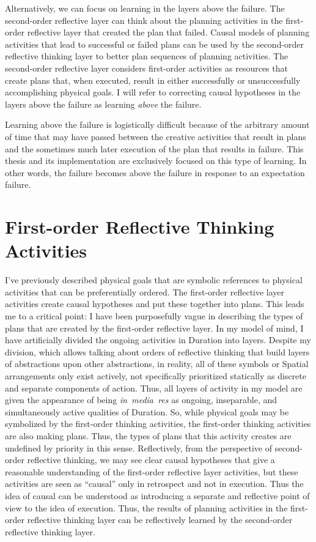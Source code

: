 Alternatively, we can focus on learning in the layers above the
failure.  The second-order reflective layer can think about the
planning activities in the first-order reflective layer that created
the plan that failed.  Causal models of planning activities that lead
to successful or failed plans can be used by the second-order
reflective thinking layer to better plan sequences of planning
activities.  The second-order reflective layer considers first-order
activities as resources that create plans that, when executed, result
in either successfully or unsuccessfully accomplishing physical goals.
I will refer to correcting causal hypotheses in the layers above the
failure as learning \emph{above} the failure.

Learning above the failure is logistically difficult because of the
arbitrary amount of time that may have passed between the creative
activities that result in plans and the sometimes much later execution
of the plan that results in failure.  This thesis and its
implementation are exclusively focused on this type of learning.  In
other words, the failure becomes above the failure in response to an
expectation failure.

\section{First-order Reflective Thinking Activities}

I've previously described physical goals that are symbolic references
to physical activities that can be preferentially ordered.  The
first-order reflective layer activities create causal hypotheses and
put these together into plans.  This leads me to a critical point: I
have been purposefully vague in describing the types of plans that are
created by the first-order reflective layer.  In my model of mind, I
have artificially divided the ongoing activities in Duration into
layers.  Despite my division, which allows talking about orders of
reflective thinking that build layers of abstractions upon other
abstractions, in reality, all of these symbols or Spatial arrangements
only exist actively, not specifically prioritized statically as
discrete and separate components of action.  Thus, all layers of
activity in my model are given the appearance of being
\emph{in~media~res} as ongoing, inseparable, and simultaneously active
qualities of Duration.  So, while physical goals may be symbolized by
the first-order thinking activities, the first-order thinking
activities are also making plans.  Thus, the types of plans that this
activity creates are undefined by priority in this sense.
Reflectively, from the perspective of second-order reflective
thinking, we may see clear causal hypotheses that give a reasonable
understanding of the first-order reflective layer activities, but
these activities are seen as ``causal'' only in retrospect and not in
execution.  Thus the idea of causal can be understood as introducing a
separate and reflective point of view to the idea of execution.  Thus,
the results of planning activities in the first-order reflective
thinking layer can be reflectively learned by the second-order
reflective thinking layer.

